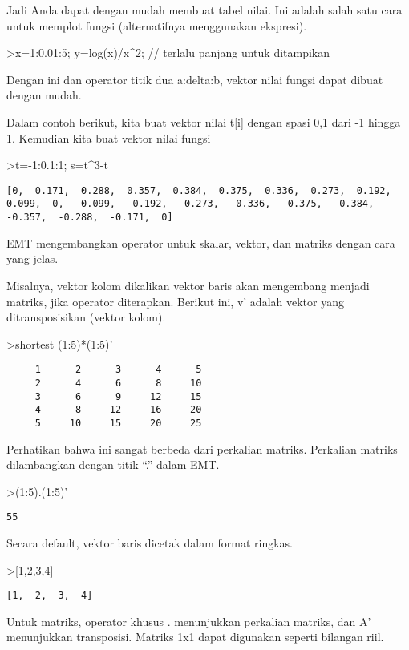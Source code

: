 \documentclass[
]{book}
\begin{document}
Jadi Anda dapat dengan mudah membuat tabel nilai. Ini adalah salah satu cara untuk memplot fungsi (alternatifnya menggunakan ekspresi).

\textgreater x=1:0.01:5; y=log(x)/x\^{}2; // terlalu panjang untuk ditampikan

Dengan ini dan operator titik dua a:delta:b, vektor nilai fungsi dapat dibuat dengan mudah.

Dalam contoh berikut, kita buat vektor nilai t{[}i{]} dengan spasi 0,1 dari -1 hingga 1. Kemudian kita buat vektor nilai fungsi

\textgreater t=-1:0.1:1; s=t\^{}3-t

\begin{verbatim}
[0,  0.171,  0.288,  0.357,  0.384,  0.375,  0.336,  0.273,  0.192,
0.099,  0,  -0.099,  -0.192,  -0.273,  -0.336,  -0.375,  -0.384,
-0.357,  -0.288,  -0.171,  0]
\end{verbatim}

EMT mengembangkan operator untuk skalar, vektor, dan matriks dengan cara yang jelas.

Misalnya, vektor kolom dikalikan vektor baris akan mengembang menjadi matriks, jika operator diterapkan. Berikut ini, v' adalah vektor yang ditransposisikan (vektor kolom).

\textgreater shortest (1:5)*(1:5)'

\begin{verbatim}
     1      2      3      4      5 
     2      4      6      8     10 
     3      6      9     12     15 
     4      8     12     16     20 
     5     10     15     20     25 
\end{verbatim}

Perhatikan bahwa ini sangat berbeda dari perkalian matriks. Perkalian matriks dilambangkan dengan titik ``.'' dalam EMT.

\textgreater(1:5).(1:5)'

\begin{verbatim}
55
\end{verbatim}

Secara default, vektor baris dicetak dalam format ringkas.

\textgreater{[}1,2,3,4{]}

\begin{verbatim}
[1,  2,  3,  4]
\end{verbatim}

Untuk matriks, operator khusus . menunjukkan perkalian matriks, dan A' menunjukkan transposisi. Matriks 1x1 dapat digunakan seperti bilangan riil.
\end{document}
